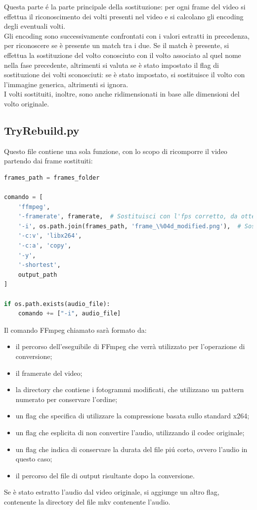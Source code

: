 \documentclass{report}
\begin{document}
Questa parte é la parte principale della sostituzione: per ogni frame del video si effettua il riconoscimento dei volti presenti nel video e si calcolano gli encoding degli eventuali volti. \\
Gli encoding sono successivamente confrontati con i valori estratti in precedenza, per riconoscere se è presente un match tra i due. Se il match è presente, si effettua la sostituzione del volto conosciuto con il volto associato al quel nome nella fase precedente, altrimenti si valuta se è stato impostato il flag di sostituzione dei volti sconosciuti: se è stato impostato, si sostituisce il volto con l'immagine generica, altrimenti si ignora. \\
I volti sostituiti, inoltre, sono anche ridimensionati in base alle dimensioni del volto originale. \\

\subsection{TryRebuild.py}
Questo file contiene una sola funzione, con lo scopo di ricomporre il video partendo dai frame sostituiti:
\begin{lstlisting}[language=Python, breaklines=true, frame=single]
frames_path = frames_folder

comando = [
    'ffmpeg',
    '-framerate', framerate,  # Sostituisci con l'fps corretto, da ottenere tramite la funzione get_framerate
    '-i', os.path.join(frames_path, 'frame_\%04d_modified.png'),  # Sostituisci con il pattern corretto
    '-c:v', 'libx264',
    '-c:a', 'copy',
    '-y',
    '-shortest',
    output_path
]

if os.path.exists(audio_file):
    comando += ["-i", audio_file]
\end{lstlisting}
Il comando FFmpeg chiamato sarà formato da:
\begin{itemize}
  \item
        il percorso dell'eseguibile di FFmpeg che verrà utilizzato per l'operazione di conversione;
  \item
        il framerate del video;
  \item
        la directory che contiene i fotogrammi modificati, che utilizzano un pattern numerato per conservare l'ordine;
  \item
        un flag che specifica di utilizzare la compressione basata sullo standard x264;
  \item
        un flag che esplicita di non convertire l’audio, utilizzando il codec originale;
  \item
        un flag che indica di conservare la durata del file piú corto, ovvero l'audio in questo caso;
  \item
        il percorso del file di output risultante dopo la conversione.
\end{itemize}
Se è stato estratto l'audio dal video originale, si aggiunge un altro flag, contenente la directory del file mkv contenente l'audio.
\end{document}
